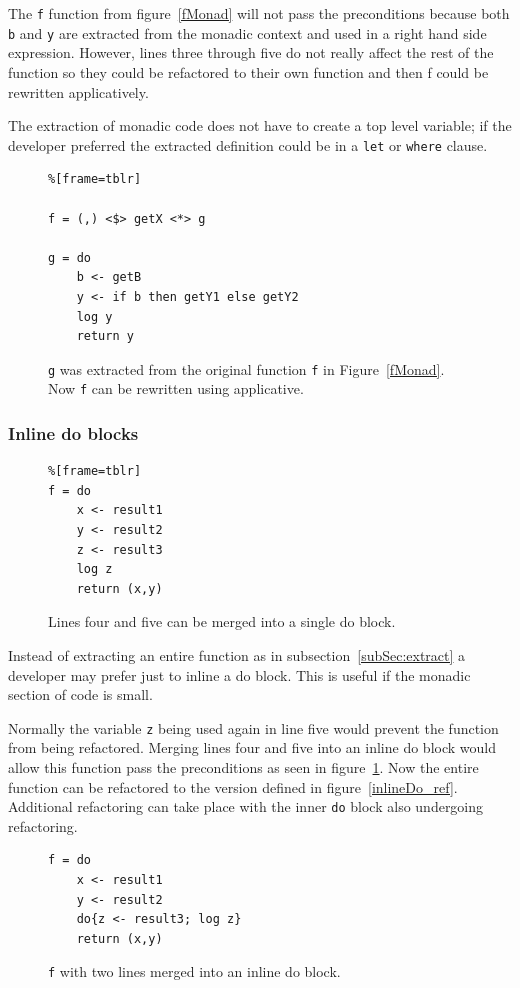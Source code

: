 The \texttt{f} function from figure~\ref{fMonad} will not pass the preconditions because both \texttt{b} and \texttt{y} are extracted from the monadic context and used in a right hand side expression. However, lines three through five do not really affect the rest of the function so they could be refactored to their own function and then f could be rewritten applicatively. 

The extraction of monadic code does not have to create a top level variable; if the developer preferred the extracted definition could be in a \texttt{let} or \texttt{where} clause.

\begin{figure}[h]
\begin{lstlisting}%[frame=tblr]

f = (,) <$> getX <*> g

g = do
	b <- getB
	y <- if b then getY1 else getY2
	log y
	return y
\end{lstlisting}
\caption{\texttt{g} was extracted from the original function \texttt{f} in Figure~\ref{fMonad}. Now \texttt{f} can be rewritten using applicative.}
\end{figure}
\subsubsection{Inline do blocks}

\begin{figure}[h]
\begin{lstlisting}%[frame=tblr]
f = do
	x <- result1
	y <- result2
	z <- result3
	log z
	return (x,y)
\end{lstlisting}
\caption{Lines four and five can be merged into a single do block.}
\end{figure}

Instead of extracting an entire function as in subsection~\ref{subSec:extract} a developer may prefer just to inline a do block. This is useful if the monadic section of code is small.

Normally the variable \texttt{z} being used again in line five would prevent the function from being refactored. Merging lines four and five into an inline do block would allow this function pass the preconditions as seen in figure~\ref{inlineDo}. Now the entire function can be refactored to the version defined in figure~\ref{inlineDo_ref}. Additional refactoring can take place with the inner \texttt{do} block also undergoing refactoring.

\begin{figure}[t]
\begin{lstlisting}
f = do
	x <- result1
	y <- result2
	do{z <- result3; log z}
	return (x,y)
\end{lstlisting}
\caption{\texttt{f} with two lines merged into an inline do block.}
\label{inlineDo}
\end{figure}

